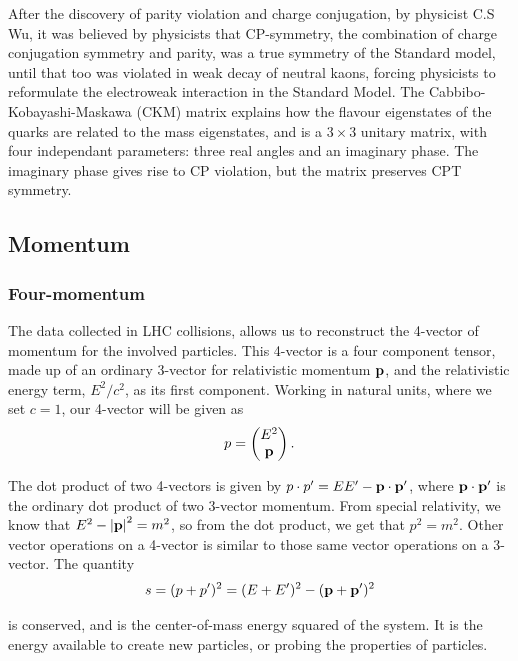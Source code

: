 \documentclass[12pt,a4paper]{article}
\numberwithin{equation}{section}
\begin{document}
After the discovery of parity violation and charge conjugation, by physicist C.S
Wu\cite{PhysRev.105.1413}, it was believed by physicists that CP-symmetry, the
combination of charge conjugation symmetry and parity, was a true symmetry of
the Standard model, until that too was violated in weak decay of neutral kaons,
forcing physicists to reformulate the electroweak interaction in the Standard
Model. The Cabbibo-Kobayashi-Maskawa (CKM) matrix explains how the flavour
eigenstates of the quarks are related to the mass eigenstates, and is a $3 \times 3$
unitary matrix, with four independant parameters: three real angles and an
imaginary phase\cite[153]{Povh2015}. The imaginary phase gives rise to CP
violation, but the matrix preserves CPT symmetry.

\subsection{Momentum}

\subsubsection{Four-momentum}
The data collected in LHC collisions, allows us to reconstruct the 4-vector of
momentum for the involved particles. This 4-vector is a four component tensor,
made up of an ordinary 3-vector for relativistic momentum $\vb p$, and the
relativistic energy term, $E^2/c^2$, as its first component. Working in natural
units, where we set $c=1$, our 4-vector will be given as
\begin{equation}
p = \left(\begin{matrix} E^2 \\ \vb p \end{matrix} \right).
\end{equation}

The dot product of two 4-vectors is given by $p\cdot p' = E E' - \vb p \cdot \vb{p'}$,
where $\vb p \cdot \vb{p'}$ is the ordinary dot product of two 3-vector momentum.
From special relativity, we know that $E^2 - \abs{\vb p}^2 = m^2$, so from the
dot product, we get that $p^2 = m^2$. Other vector operations on a 4-vector is
similar to those same vector operations on a 3-vector. The quantity
\begin{equation}
s = (p + p')^2 = (E + E')^2 - (\vb p + \vb p')^2
\end{equation}

is conserved, and is the center-of-mass energy squared of the system. It is the
energy available to create new particles, or probing the properties of
particles.
\end{document}
